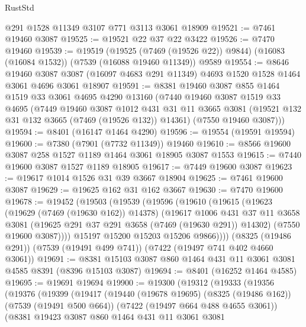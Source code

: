 \begin{lexlean}{RustStd}
\begin{coremodule}
    @291
    @1528
    @11349
    @3107
    @771
    @3113
    @3061
    @18909
@19521 := @7461 @19460 @3087
@19525 := @19521 @22 @37 @22 @3422
@19526 := @7470 @19460
@19539 := @19519
    (@19525 (@7469 (@19526 @22)) @9844)
    (@16083 (@16084 @1532))
    (@7539 (@16088 @19460 @11349))
    @9589
@19554 := @8646
    @19460
    @3087
    @3087
    (@16097 @4683 @291 @11349)
    @4693
    @1520
    @1528
    @1464
    @3061
    @4696
    @3061
    @18907
@19591 := @8381
    @19460
    @3087
    @855
    @1464
    @1519
    @33
    @3061
    @4695
    @4290
    @13160
    (@7440
      @19460
      @3087
      @1519
      @33
      @4695
      (@7449
        @19460
        @3087
        @1012
        @431
        @31
        @11
        @3665
        @3081
        (@19521 @132 @31 @132 @3665 (@7469 (@19526 @132)) @14361)
        (@7550 @19460 @3087)))
@19594 := @8401 (@16147 @1464 @4290)
@19596 := @19554 (@19591 @19594)
@19600 := @7380 (@7901 (@7732 @11349)) @19460
@19610 := @8566 @19600 @3087 @258 @1527 @1189 @1464 @3061 @18905 @3087 @1553
@19615 := @7440 @19600 @3087 @1527 @1189 @18905
@19617 := @7449 @19600 @3087
@19623 := @19617 @1014 @1526 @31 @39 @3667 @18904
@19625 := @7461 @19600 @3087
@19629 := @19625 @162 @31 @162 @3667
@19630 := @7470 @19600
@19678 := @19452
    (@19503
      (@19539
        (@19596
          (@19610
            (@19615
              (@19623
                (@19629 (@7469 (@19630 @162)) @14378)
                (@19617
                  @1006
                  @431
                  @37
                  @11
                  @3658
                  @3081
                  (@19625 @291 @37 @291 @3658 (@7469 (@19630 @291)) @14302)
                  (@7550 @19600 @3087))))
            @15197
            @15200
            @15203
            @15206
            @9866))))
    (@8325 (@19486 @291))
    (@7539 (@19491 @499 @741))
    (@7422 (@19497 @741 @402 @4660 @3061))
@19691 := @8381 @15103 @3087 @860 @1464 @431 @11 @3061 @3081 @4585 @8391 (@8396 @15103 @3087)
@19694 := @8401 (@16252 @1464 @4585)
@19695 := @19691 @19694
@19900 := @19300
    (@19312
      (@19333
        (@19356
          (@19376
            (@19399
              (@19417
                (@19440
                  (@19678 @19695)
                  (@8325 (@19486 @162))
                  (@7539 (@19491 @500 @664))
                  (@7422 (@19497 @664 @488 @4655 @3061))
                  (@8381
                    @19423
                    @3087
                    @860
                    @1464
                    @431
                    @11
                    @3061
                    @3081

\end{coremodule}
\end{lexlean}
